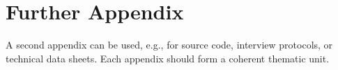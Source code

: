 \chapter{Further Appendix}

A second appendix can be used, e.g., for source code, interview protocols, or technical data sheets. Each appendix should form a coherent thematic unit.